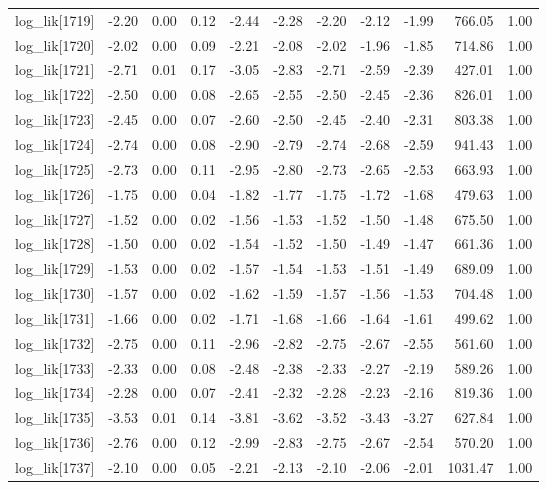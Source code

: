 \begin{table}[ht]
\begin{tabular}{rrrrrrrrrrr}
  log\_lik[1719] & -2.20 & 0.00 & 0.12 & -2.44 & -2.28 & -2.20 & -2.12 & -1.99 & 766.05 & 1.00 \\ 
  log\_lik[1720] & -2.02 & 0.00 & 0.09 & -2.21 & -2.08 & -2.02 & -1.96 & -1.85 & 714.86 & 1.00 \\ 
  log\_lik[1721] & -2.71 & 0.01 & 0.17 & -3.05 & -2.83 & -2.71 & -2.59 & -2.39 & 427.01 & 1.00 \\ 
  log\_lik[1722] & -2.50 & 0.00 & 0.08 & -2.65 & -2.55 & -2.50 & -2.45 & -2.36 & 826.01 & 1.00 \\ 
  log\_lik[1723] & -2.45 & 0.00 & 0.07 & -2.60 & -2.50 & -2.45 & -2.40 & -2.31 & 803.38 & 1.00 \\ 
  log\_lik[1724] & -2.74 & 0.00 & 0.08 & -2.90 & -2.79 & -2.74 & -2.68 & -2.59 & 941.43 & 1.00 \\ 
  log\_lik[1725] & -2.73 & 0.00 & 0.11 & -2.95 & -2.80 & -2.73 & -2.65 & -2.53 & 663.93 & 1.00 \\ 
  log\_lik[1726] & -1.75 & 0.00 & 0.04 & -1.82 & -1.77 & -1.75 & -1.72 & -1.68 & 479.63 & 1.00 \\ 
  log\_lik[1727] & -1.52 & 0.00 & 0.02 & -1.56 & -1.53 & -1.52 & -1.50 & -1.48 & 675.50 & 1.00 \\ 
  log\_lik[1728] & -1.50 & 0.00 & 0.02 & -1.54 & -1.52 & -1.50 & -1.49 & -1.47 & 661.36 & 1.00 \\ 
  log\_lik[1729] & -1.53 & 0.00 & 0.02 & -1.57 & -1.54 & -1.53 & -1.51 & -1.49 & 689.09 & 1.00 \\ 
  log\_lik[1730] & -1.57 & 0.00 & 0.02 & -1.62 & -1.59 & -1.57 & -1.56 & -1.53 & 704.48 & 1.00 \\ 
  log\_lik[1731] & -1.66 & 0.00 & 0.02 & -1.71 & -1.68 & -1.66 & -1.64 & -1.61 & 499.62 & 1.00 \\ 
  log\_lik[1732] & -2.75 & 0.00 & 0.11 & -2.96 & -2.82 & -2.75 & -2.67 & -2.55 & 561.60 & 1.00 \\ 
  log\_lik[1733] & -2.33 & 0.00 & 0.08 & -2.48 & -2.38 & -2.33 & -2.27 & -2.19 & 589.26 & 1.00 \\ 
  log\_lik[1734] & -2.28 & 0.00 & 0.07 & -2.41 & -2.32 & -2.28 & -2.23 & -2.16 & 819.36 & 1.00 \\ 
  log\_lik[1735] & -3.53 & 0.01 & 0.14 & -3.81 & -3.62 & -3.52 & -3.43 & -3.27 & 627.84 & 1.00 \\ 
  log\_lik[1736] & -2.76 & 0.00 & 0.12 & -2.99 & -2.83 & -2.75 & -2.67 & -2.54 & 570.20 & 1.00 \\ 
  log\_lik[1737] & -2.10 & 0.00 & 0.05 & -2.21 & -2.13 & -2.10 & -2.06 & -2.01 & 1031.47 & 1.00 \\ 

\end{tabular}
\end{table}
